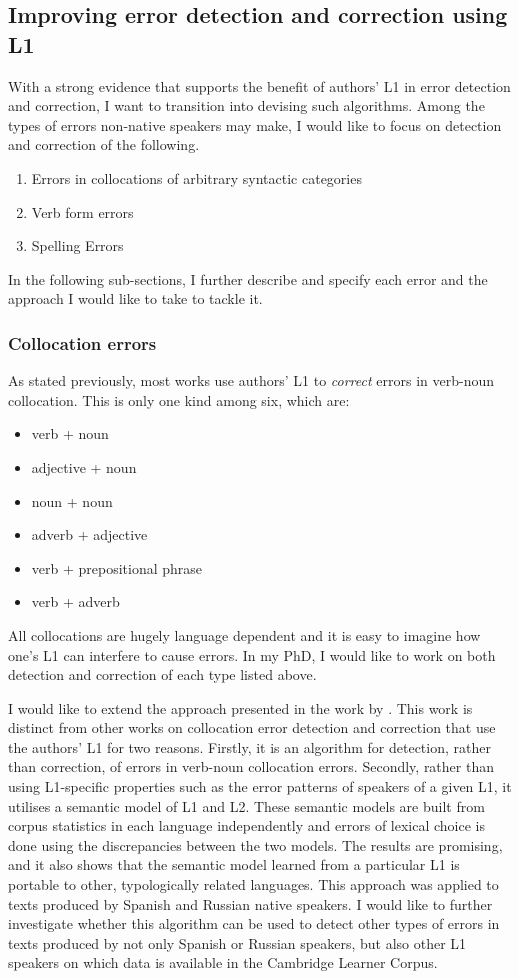 \documentclass[11pt]{article}
\begin{document}
\subsection{Improving error detection and correction using L1}
With a strong evidence that supports the benefit of authors' L1 in error 
detection and correction, I want to transition into devising such algorithms.
Among the types of errors non-native speakers may make, I would like to focus on 
detection and correction of the following.
\begin{enumerate}
\item Errors in collocations of arbitrary syntactic categories\label{error:1}
\item Verb form errors \label{error:2}
\item Spelling Errors \label{error:3}
\end{enumerate}
In the following sub-sections, I further describe and specify each error and the 
approach I would like to take to tackle it.
\subsubsection{Collocation errors}
\label{subsub:collocation}
As stated previously, most works use authors' L1 to \emph{correct} errors in 
verb-noun collocation. This is only one kind among six, which are:
\begin{itemize}
\item verb + noun
\item adjective + noun
\item noun + noun
\item adverb + adjective
\item verb + prepositional phrase
\item verb + adverb
\end{itemize}
All collocations are hugely language dependent and it is easy to imagine how 
one's L1 can interfere to cause errors. In my PhD, I would like to work on both 
detection and correction of each type listed above.

I would like to extend the approach presented in the work by 
\cite{kochmarcross}.  This work is distinct from other works on collocation 
error detection and correction that use the authors’ L1 for two reasons. 
Firstly, it is an algorithm for detection, rather than correction, of errors in 
verb-noun collocation errors. Secondly, rather than using L1-specific properties 
such as the error patterns of speakers of a given L1, it utilises a semantic 
model of L1 and L2. These semantic models are built from corpus statistics in 
each language independently and errors of lexical choice is done using the 
discrepancies between the two models. The results are promising, and it also 
shows that the semantic model learned from a particular L1 is portable to other, 
typologically related languages. This approach was applied to texts produced by 
Spanish and Russian native speakers. I would like to further investigate whether 
this algorithm can be used to detect other types of errors in texts produced by 
not only Spanish or Russian speakers, but also other L1 speakers on which data 
is available in the Cambridge Learner Corpus.
					
\end{document}
